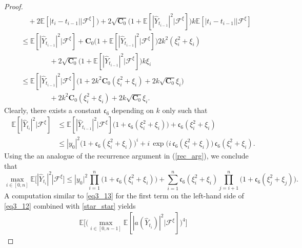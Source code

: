 \begin{proof}
\begin{align}
        &\quad+ 2 \mathbb{E} [|t_{i} - t_{i-1}||\mathcal{F}^{\xi}]\big) +  2 \sqrt{\mathbf{C}_0} \big( 1 + \mathbb{E}[|\hat{Y}_{t_{i-1}}|^2|\mathcal{F}^{\xi}] \big) k \mathbb{E} [|t_{i} - t_{i-1}||\mathcal{F}^{\xi}]\nonumber \\
        &\leq \mathbb{E}[|\hat{Y}_{t_{i-1}}|^2|\mathcal{F}^{\xi}] + \mathbf{C}_0 \big( 1 + \mathbb{E}[|\hat{Y}_{t_{i-1}}|^2|\mathcal{F}^{\xi}] \big)  2k^2(\xi_i^2 + \xi_i) \\
        &\qquad\qquad+  2 \sqrt{\mathbf{C}_0} \big(1 + \mathbb{E}[|\hat{Y}_{t_{i-1}}|^2|\mathcal{F}^{\xi}] \big) k \xi_i\nonumber \\
        &\leq \mathbb{E}[|\hat{Y}_{t_{i-1}}|^2|\mathcal{F}^{\xi}]\big( 1 + 2k^2 \mathbf{C}_0 (\xi_i^2 + \xi_i) +  2k \sqrt{\mathbf{C}_0}   \xi_i \big) \nonumber \\
        &\qquad\qquad + 2k^2 \mathbf{C}_0 (\xi_i^2 + \xi_i) + 2k \sqrt{\mathbf{C}_0}   \xi_i.  \nonumber
\end{align}
Clearly, there exists a constant $\mathfrak{c}_6$ depending on $k$ only such that
\begin{equation*}
    \begin{split}
        \mathbb{E}[|\hat{Y}_{t_i}|^2|\mathcal{F}^{\xi}] 
        &\leq \mathbb{E}[|\hat{Y}_{t_{i-1}}|^2|\mathcal{F}^{\xi}]\big(1 + \mathfrak{c}_6(\xi_i^2 + \xi_i)\big) + \mathfrak{c}_6(\xi_i^2 + \xi_i) \\
        &\leq|y_0|^2 \big(1 + \mathfrak{c}_6(\xi_i^2 + \xi_i)\big)^i + i \, \exp \big(i \, \mathfrak{c}_6(\xi_i^2 + \xi_i)\big) \, \mathfrak{c}_6(\xi_i^2 + \xi_i).
    \end{split}
\end{equation*}
Using the an analogue of the recurrence argument in (\ref{rec_arg}), we conclude that  
\begin{equation}\label{star_star}
    \max_{i \in [0, n]} \mathbb{E}[|\hat{Y}_{t_{i}}|^2 |\mathcal{F}^{\xi}] \leq |y_0|^2 \prod_{i=1}^n \big(1 + \mathfrak{c}_6(\xi_i^2 + \xi_i)\big) + \sum_{i=1}^n \mathfrak{c}_6(\xi_i^2 + \xi_i) \prod_{j=i+1}^n \big(1 + \mathfrak{c}_6(\xi_j^2 + \xi_j)\big).
\end{equation}
A computation similar to \eqref{eq3_13} for the first term on the left-hand side of \eqref{eq3_12} combined with \eqref{star_star} yields
    \begin{align}
        \mathbb{E} \Bigg[\bigg(\max_{i \in [0, n-1]} \mathbb{E}[|a(\hat{Y}_{t_{i}})|^2 |\mathcal{F}^{\xi}]\bigg)^4\Bigg]

\end{align}
\end{proof}
